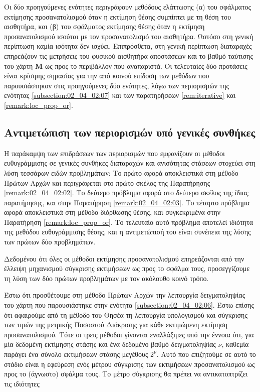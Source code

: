 Οι δύο προηγούμενες ενότητες περιγράφουν μεθόδους ελάττωσης (α) του σφάλματος
εκτίμησης προσανατολισμού όταν η εκτίμηση θέσης συμπίπτει με τη θέση του
αισθητήρα, και (β) του σφάλματος εκτίμησης θέσης όταν η εκτίμηση
προσανατολισμού ισούται με τον προσανατολισμό του αισθητήρα. Ωστόσο στη γενική
περίπτωση καμία ισότητα δεν ισχύει. Επιπρόσθετα, στη γενική περίπτωση
διαταραχές επηρεάζουν τις μετρήσεις του φυσικού αισθητήρα αποστάσεων και το
βαθμό ταύτισης του χάρτη $\bm{M}$ ως προς το περιβάλλον που αναπαριστά. Οι
τελευταίες δύο προτάσεις είναι κρίσιμης σημασίας για την από κοινού επίδοση των
μεθόδων που παρουσιάστηκαν στις προηγούμενες δύο ενότητες, λόγω των περιορισμών
της ενότητας \ref{subsection:02_04_02:07} και των παρατηρήσεων
\ref{rem:iterative} και \ref{remark:loc_prop_or}.


\subsection{Αντιμετώπιση των περιορισμών υπό γενικές συνθήκες}

Η παράκαμψη των επιδράσεων των περιορισμών που εμφανίζουν οι μέθοδοι
ευθυγράμμισης σε γενικές συνθήκες διαταραχών και ανισότητας στάσεων στοχεύει
στη λύση τεσσάρων ειδών προβλημάτων: Το πρώτο αφορά αποκλειστικά στη μέθοδο Πρώτων
Αρχών και περιγράφεται στο πρώτο σκέλος της Παρατήρησης
\ref{remark:02_04_02:02}. Το δεύτερο πρόβλημα αφορά στο δεύτερο σκέλος της
ίδιας παρατήρησης, και στην Παρατήρηση \ref{remark:02_04_02:03}. Το τέταρτο
πρόβλημα αφορά αποκλειστικά στη μέθοδο διόρθωσης θέσης, και συγκεκριμένα στην
Παρατήρηση \ref{remark:loc_prop_or}. Το τελευταίο αυτό πρόβλημα αποτελεί
ιδιότητα της μεθόδου ευθυγράμμισης θέσης, και η αντιμετώπισή του είναι συνέπεια
της λύσης των πρώτων δύο προβλημάτων.

Δεδομένου ότι όλες οι μέθοδοι εκτίμησης προσανατολισμού επηρεάζονται από την
έλλειψη μηχανισμού σύγκρισης εκτιμήσεων ως προς το σφάλμα τους, προσεγγίζουμε
τη λύση των δύο πρώτων προβλημάτων με τον ακόλουθο κοινό τρόπο.

Έστω ότι προσθέτουμε στη μέθοδο Πρώτων Αρχών την λειτουργία δειγματοληψίας του
χάρτη που παρουσιάστηκε στην ενότητα \ref{subsection:02_04_02:06}. Έστω επίσης
ότι αφαιρούμε από τη μέθοδο του Θησέα τη λειτουργία υπολογισμού και σύγκρισης
των τιμών της μετρικής Ποσοστού Διάκρισης για κάθε εκτιμώμενη εκτίμηση
προσανατολισμού. Τότε οι τρεις μέθοδοι γίνονται εναλλάξιμες υπό την έννοια ότι,
για μία δεδομένη εκτίμησης στάσης και ένα δεδομένο βαθμό δειγματοληψίας $\nu$,
καθεμία παράγει ένα σύνολο εκτιμήσεων στάσης μεγέθους $2^\nu$. Αυτό που
επιζητούμε σε αυτό το στάδιο είναι η εφεύρεση ενός μέτρου σύγκρισης των
εκτιμήσεων προσανατολισμού ως προς το (άγνωστο) σφάλμα τους. Το μέτρο σύγκρισης
θα πρέπει να αντικατοπτρίζει τις ιδιότητες

